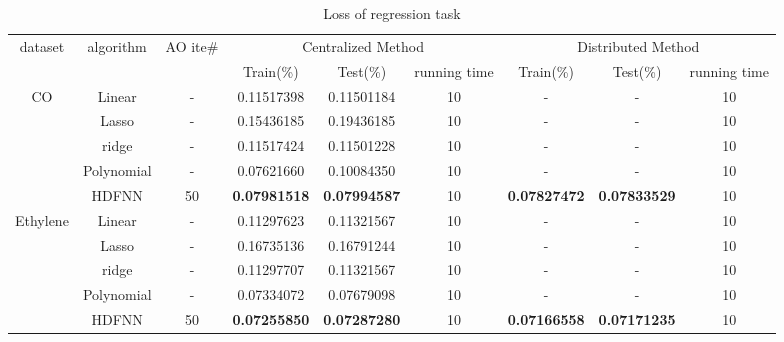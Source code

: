 \documentclass[journal,twocolumn,10pt]{IEEEtran}
\begin{document}
\begin{table*}[!ht]
  \centering
  {\fontsize{9pt}{10pt}\selectfont
  \vspace{-15pt}
  \caption{Loss of regression task}
  \begin{tabular}{|c|c|c|c|c|c|c|c|c|} \hline
  \multirow{2}{*}{dataset} & \multirow{2}{*}{algorithm}  & \multirow{2}{*}{AO ite\#} & \multicolumn{3}{|c|}{Centralized Method} & \multicolumn{3}{|c|}{Distributed Method}    \\ \cline{4-9}
                            &             &      &Train(\%)            & Test(\%)           & running time & Train(\%)          & Test(\%)           & running time  \\ \hline
  \multirow{3}{*}{CO}       & Linear    & -    & 0.11517398          & 0.11501184         & 10           & -                  & -                   & 10           \\ \cline{2-9}
                            & Lasso     & -    & 0.15436185          & 0.19436185         & 10           & -                  & -                   & 10           \\ \cline{2-9}
                            & ridge     & -    & 0.11517424          & 0.11501228         & 10           & -                  & -                   & 10           \\ \cline{2-9}
                            & Polynomial& -    & 0.07621660          & 0.10084350         & 10           & -                  & -                   & 10           \\ \cline{2-9}
                            & HDFNN     & 50   & \textbf{0.07981518} & \textbf{0.07994587}& 10           & \textbf{0.07827472}& \textbf{0.07833529} & 10           \\ \hline
  \multirow{3}{*}{Ethylene} & Linear    & -    & 0.11297623          & 0.11321567         & 10           & -                  & -                   & 10           \\ \cline{2-9}
                            & Lasso     & -    & 0.16735136          & 0.16791244         & 10           & -                  & -                   & 10           \\ \cline{2-9}
                            & ridge     & -    & 0.11297707          & 0.11321567         & 10           & -                  & -                   & 10           \\ \cline{2-9}
                            & Polynomial& -    & 0.07334072          & 0.07679098         & 10           & -                  & -                   & 10           \\ \cline{2-9}
                            & HDFNN     & 50& \textbf{0.07255850} & \textbf{0.07287280}& 10           & \textbf{0.07166558}& \textbf{0.07171235} & 10           \\ \hline
  \end{tabular}}
  \vspace{-10pt}
  \label{tab:reg_loss}
\end{table*}
\end{document}

